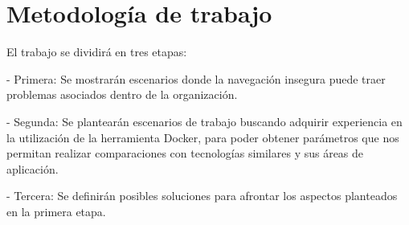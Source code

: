 \section{Metodología de trabajo}
El trabajo se dividirá en tres etapas:

-	Primera: Se mostrarán escenarios donde la navegación insegura puede traer problemas 
asociados dentro de la organización. 

-	Segunda: Se plantearán escenarios de trabajo buscando adquirir experiencia en la 
utilización de la herramienta Docker, para poder obtener parámetros que nos permitan 
realizar comparaciones con tecnologías similares y sus áreas de aplicación.

-	Tercera: Se definirán posibles soluciones para afrontar 
los aspectos planteados en la primera etapa. 



